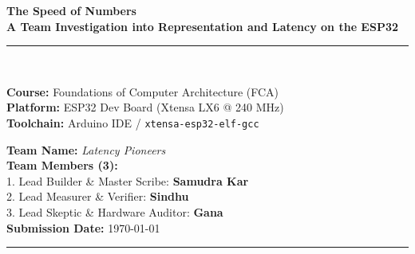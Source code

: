 \documentclass[10pt,a4paper]{article}
\begin{document}
\begin{titlepage}
    \centering
    \vspace*{0.5cm}
    {\Huge \bfseries \color{primaryBlue} The Speed of Numbers}\\[0.4cm]
    {\Large \bfseries \color{secondaryTeal} A Team Investigation into Representation and Latency on the ESP32}\\[0.8cm]
    
    \rule{\linewidth}{1.2pt}\\[0.4cm]
    
    \begin{minipage}{0.48\textwidth}
        \textbf{Course:} Foundations of Computer Architecture (FCA)\\
        \textbf{Platform:} ESP32 Dev Board (Xtensa LX6 @ 240 MHz)\\
        \textbf{Toolchain:} Arduino IDE / \texttt{xtensa-esp32-elf-gcc}
    \end{minipage}
    \hfill
    \begin{minipage}{0.48\textwidth}
        \raggedleft
        \textbf{Team Name:} \textit{Latency Pioneers}\\
        \textbf{Team Members (3):}\\
        1. Lead Builder \& Master Scribe: \textbf{Samudra Kar}\\
        2. Lead Measurer \& Verifier: \textbf{Sindhu}\\
        3. Lead Skeptic \& Hardware Auditor: \textbf{Gana}\\
        \textbf{Submission Date:} \today
    \end{minipage}
    \vspace{0.4cm}
    \rule{\linewidth}{1.2pt}
    
    \vspace{0.8cm}
    

\end{titlepage}
\end{document}
